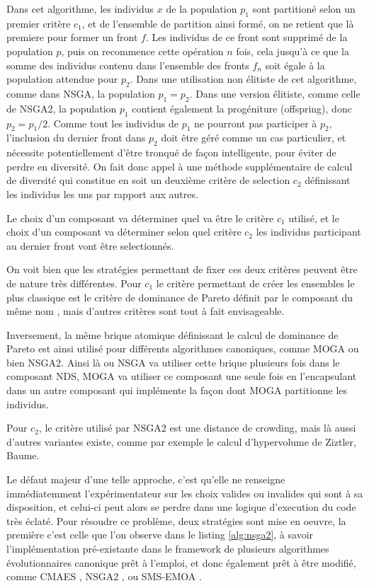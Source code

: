 Dans cet algorithme, les individus $x$ de la population $p_1$ sont partitioné selon un premier critère $c_1$, et de l'ensemble de partition ainsi formé, on ne retient que là premiere pour former un front $f$. Les individus de ce front sont supprimé de la population $p$, puis on recommence cette opération $n$ fois, cela jusqu'à ce que la somme des individus contenu dans l'ensemble des fronts $f_n$ soit égale à la population attendue pour $p_2$. Dans une utilisation non élitiste de cet algorithme, comme dans NSGA, la population $p_1 = p_2$. Dans une version élitiste, comme celle de NSGA2, la population $p_1$ contient également la progéniture (offspring), donc $p_2 = p_1 / 2$. Comme tout les individus de $p_1$ ne pourront pas participer à $p_2$, l'inclusion du dernier front dans $p_2$ doit être géré comme un cas particulier, et nécessite potentiellement d'être tronqué de façon intelligente, pour éviter de perdre en diversité. On fait donc appel à une méthode supplémentaire de calcul de diversité qui constitue en soit un deuxième critère de selection $c_2$ définissant les individus les uns par rapport aux autres.

Le choix d'un composant  va déterminer quel va être le critère $c_1$ utilisé, et le choix d'un composant  va déterminer selon quel critère $c_2$ les individus participant au dernier front vont être selectionnés. 

On voit bien que les stratégies permettant de fixer ces deux critères peuvent être de nature très différentes. Pour $c_1$ le critère permettant de créer les ensembles le plus classique est le critère de dominance de Pareto définit par le composant du même nom , mais d'autres critères sont tout à fait envisageable. 

Inversement, la même brique atomique définissant le calcul de dominance de Pareto est ainsi utilisé pour différents algorithmes canoniques, comme MOGA ou bien NSGA2. Ainsi là ou NSGA va utiliser cette brique plusieurs fois dans le composant NDS, MOGA va utiliser ce composant une seule fois en l'encapsulant dans un autre composant qui implémente la façon dont MOGA partitionne les individus.

Pour $c_2$, le critère utilisé par NSGA2 est une distance de crowding, mais là aussi d'autres variantes existe, comme par exemple le calcul d'hypervolume de Ziztler, Baume.

Le défaut majeur d'une telle approche, c'est qu'elle ne renseigne immédiatemment l'expérimentateur sur les choix valides ou invalides qui sont à sa disposition, et celui-ci peut alors se perdre dans une logique d'execution du code très éclaté. Pour résoudre ce problème, deux stratégies sont mise en oeuvre, la première c'est celle que l'on observe dans le listing \ref{alg:nsga2}, à savoir l'implémentation pré-existante dans le framework de plusieurs algorithmes évolutionnaires canonique prêt à l'emploi, et donc également prêt à être modifié, comme CMAES \autocite{Hansen}, NSGA2 \autocite{Deb2001}, ou SMS-EMOA \autocite{Beume2007}.

